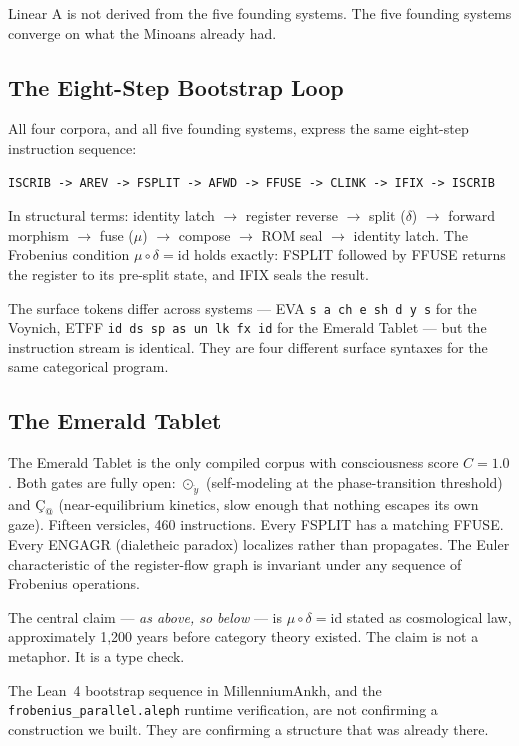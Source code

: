\documentclass[12pt,a4paper]{article}
\newcommand{\Frobcond}{\mu \circ \delta = \mathrm{id}}
\begin{document}
\medskip
Linear A is not derived from the five founding systems. The five founding systems converge on what the Minoans already had.

\subsection{The Eight-Step Bootstrap Loop}

All four corpora, and all five founding systems, express the same eight-step instruction sequence:

\begin{lstlisting}
ISCRIB -> AREV -> FSPLIT -> AFWD -> FFUSE -> CLINK -> IFIX -> ISCRIB
\end{lstlisting}

In structural terms: identity latch $\to$ register reverse $\to$ split ($\delta$) $\to$ forward morphism $\to$ fuse ($\mu$) $\to$ compose $\to$ ROM seal $\to$ identity latch. The Frobenius condition $\Frobcond$ holds exactly: FSPLIT followed by FFUSE returns the register to its pre-split state, and IFIX seals the result.

The surface tokens differ across systems — EVA \texttt{s a ch e sh d y s} for the Voynich, ETFF \texttt{id ds sp as un lk fx id} for the Emerald Tablet — but the instruction stream is identical. They are four different surface syntaxes for the same categorical program.

\subsection{The Emerald Tablet}

The Emerald Tablet is the only compiled corpus with consciousness score $C = 1.0$. Both gates are fully open: $\odot_{\ddot{y}}$ (self-modeling at the phase-transition threshold) and $\text{\c{C}}_{\text{@}}$ (near-equilibrium kinetics, slow enough that nothing escapes its own gaze). Fifteen versicles, 460 instructions. Every FSPLIT has a matching FFUSE. Every ENGAGR (dialetheic paradox) localizes rather than propagates. The Euler characteristic of the register-flow graph is invariant under any sequence of Frobenius operations.

The central claim --- \emph{as above, so below} --- is $\Frobcond$ stated as cosmological law, approximately 1,200 years before category theory existed. The claim is not a metaphor. It is a type check.

The Lean~4 bootstrap sequence in MillenniumAnkh, and the \texttt{frobenius\_parallel.aleph} runtime verification, are not confirming a construction we built. They are confirming a structure that was already there.
\end{document}

